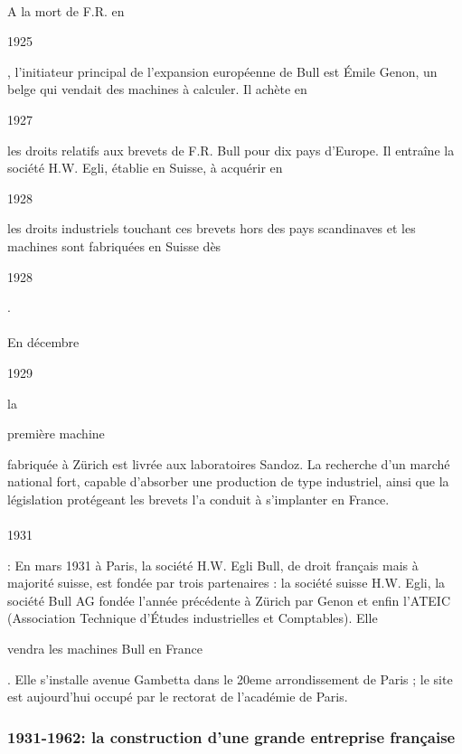 \documentclass[11pt]{article}
\begin{document}
		\paragraph{}
		A la mort de F.R. en \begin{bf}1925\end{bf}, l'initiateur principal de l'expansion européenne de Bull est Émile 
		Genon, un belge qui vendait des machines à calculer. Il achète en \begin{bf}1927\end{bf} les droits relatifs aux 
		brevets de F.R. Bull pour dix pays d'Europe. Il entraîne la société H.W. Egli, établie en Suisse, à acquérir en \begin{bf}1928\end{bf}
		 les droits industriels touchant ces brevets hors des pays scandinaves et les machines sont fabriquées en Suisse dès \begin{bf}1928\end{bf}.
		\paragraph{}
		En décembre \begin{bf}1929\end{bf} la \begin{bf}première machine\end{bf} fabriquée à Zürich est livrée aux laboratoires Sandoz. 
		La recherche d’un marché national fort, capable d’absorber une production de type industriel, ainsi que la législation 
		protégeant les brevets l’a conduit à s’implanter en France.
		\paragraph{}
		\begin{bf}1931\end{bf}: En mars 1931 à Paris, la société H.W. Egli Bull, de droit français mais à majorité suisse, 
		est fondée par trois partenaires : la société suisse H.W. Egli, la société Bull AG fondée l'année précédente à Zürich 
		par Genon et enfin l'ATEIC (Association Technique d'Études industrielles et Comptables). Elle \begin{bf}vendra les 
		machines Bull en France\end{bf}. Elle s’installe avenue Gambetta dans le 20eme arrondissement de Paris ; le site est 
		aujourd’hui occupé par le rectorat de l’académie de Paris.
		\subsubsection{1931-1962: la construction d'une grande entreprise française}
\end{document}
